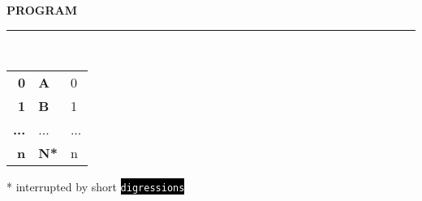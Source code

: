 \begin{frame}

\textbf{PROGRAM}\\
\noindent\rule{1cm}{0.4pt}\\

\bigskip

\begin{tabular}{r|l|l} 
	\textbf{0} & \textbf{A} & {\small 0} \\
	\textbf{1} & \textbf{B} & {\small 1}\\
	\textbf{...} & 	...		& {\small ...}\\
	\textbf{n} & \textbf{N*} & {\small n}\\
\end{tabular}

\bigskip

* interrupted by short \colorbox{black}{\textcolor{white}{\texttt{digressions}}}

\end{frame}